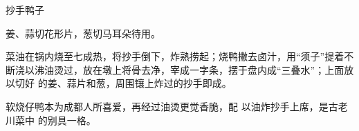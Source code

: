 \begin{recipe}{抄手鸭子}

\ingredients


\cooking

\step 姜、蒜切花形片，葱切马耳朵待用。

\step 菜油在锅内烧至七成热，将抄手倒下，炸熟捞起；烧鸭撇去卤汁，用“须子”提着不
断浇以沸油烫过，放在墩上将骨去净，宰成一字条，摆于盘内成“三叠水”；上面放以切好
的姜、蒜片和葱，周围镶上炸过的抄手即成。

\features

软烧仔鸭本为成都人所喜爱，再经过油烫更觉香脆，配 以油炸抄手上席，是古老川菜中
的别具一格。

\end{recipe}

